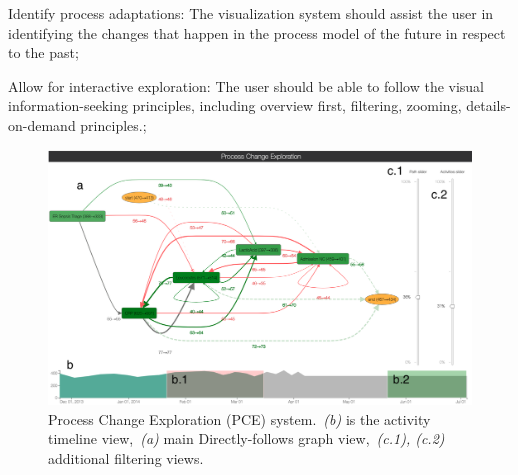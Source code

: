 \begin{requidescr}
	\item[Identify process adaptations:\namedlabel{req:adaptation}] The visualization system should assist the user in identifying the changes that happen in the process model of the future in respect to the past;
	\item[Allow for interactive exploration:\namedlabel{req:interactive}] The user should be able to follow the visual information-seeking principles, including overview first, filtering, zooming, details-on-demand principles.;
\end{requidescr} %


\begin{figure}
	\centering
	\includegraphics[width=\textwidth]{img/vis/vis-system-two-brushes.png}
	\caption{Process Change Exploration (PCE) system.~\emph{(b)} is the activity timeline view,~\emph{(a)} main Directly-follows graph view,~\emph{(c.1), (c.2)} additional filtering views.} 
	\label{fig:vis-two-brushes}
\end{figure}



